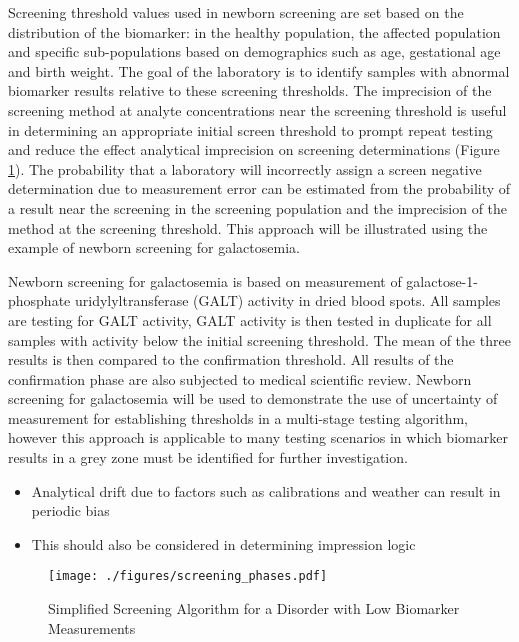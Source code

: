 \documentclass[review]{elsarticle}
\begin{document}
Screening threshold values used in newborn screening are set based on
the distribution of the biomarker: in the healthy population, the
affected population and specific sub-populations based on demographics
such as age, gestational age and birth weight. The goal of the
laboratory is to identify samples with abnormal biomarker results
relative to these screening thresholds. The imprecision of the
screening method at analyte concentrations near the screening
threshold is useful in determining an appropriate initial screen
threshold to prompt repeat testing and reduce the effect analytical
imprecision on screening determinations (Figure \ref{fig:org2e19c20}). The
probability that a laboratory will incorrectly assign a screen
negative determination due to measurement error can be estimated from
the probability of a result near the screening in the screening
population and the imprecision of the method at the screening
threshold. This approach will be illustrated using the example of
newborn screening for galactosemia.

Newborn screening for galactosemia is based on measurement of
galactose-1-phosphate uridylyltransferase (GALT) activity in dried
blood spots. All samples are testing for GALT activity, GALT activity
is then tested in duplicate for all samples with activity below the
initial screening threshold. The mean of the three results is then
compared to the confirmation threshold. All results of the
confirmation phase are also subjected to medical scientific
review. Newborn screening for galactosemia will be used to demonstrate
the use of uncertainty of measurement for establishing thresholds in a
multi-stage testing algorithm, however this approach is applicable to
many testing scenarios in which biomarker results in a grey zone
must be identified for further investigation.

\begin{itemize}
\item Analytical drift due to factors such as calibrations and weather can
result in periodic bias
\item This should also be considered in determining impression logic
\end{itemize}



\begin{figure}[htbp]
\centering
\texttt{[image: ./figures/screening\_phases.pdf]}
\caption{\label{fig:org2e19c20}Simplified Screening Algorithm for a Disorder with Low Biomarker Measurements}
\end{figure}
\end{document}

